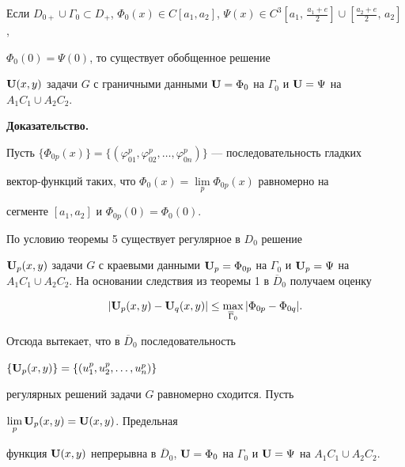 \begin{lem}


Если $D_{0+}\cup \Gamma_0\subset


D_+$, $\Phi_0(x)\in C[a_1,a_2]$, $\Psi (x)\in


C^3[a_1,\,\frac{a_1+e}{2}]\cup [\frac{a_2+e}{2},\,a_2]$,


$\Phi_0(0)=\Psi(0)$, то существует обобщенное решение


${\bold U}(x,y)$ задачи $G$ с граничными данными ${\bold


U}=\Phi_0$ на $\Gamma_0$ и ${\bold U}=\Psi$ на $A_1C_1\cup A_2C_2$.


\end{lem}





{\bf Доказательство.}


Пусть $\{\Phi_{0p}(x)\}=\{(\varphi_{01}^p,\varphi


_{02}^p,\dotsc,\varphi_{0n}^p)\}$ --- последовательность гладких


вектор-функций таких, что $\Phi


_{0}(x)=\lim\limits_p\Phi_{0p}(x)$ равномерно на


сегменте $[a_1,a_2]$ и $\Phi_{0p}(0)=\Phi_0(0)$.


По условию теоремы 5 существует регулярное в $D_0$ решение


${\bold U}_p(x,y)$ задачи $G$ с краевыми данными ${\bold U}_p=\Phi


_{0p}$ на $\Gamma_0$ и ${\bold U}_p=\Psi$ на $A_1C_1 \cup


A_2C_2$. На основании следствия из теоремы 1 в $\overline


D_0$ получаем оценку


$$


|{\bold U}_p(x,y)-{\bold U}_q(x,y)|\le \max_{\overline


\Gamma_0}|\Phi_{0p}-\Phi_{0q}|.


$$


Отсюда вытекает, что в $\overline D_0$ последовательность


$\{{\bold U}_p(x,y)\}=\{(u_1^p,u_2^p,\dotsc,u_n^p)\}$


регулярных решений задачи $G$ равномерно сходится. Пусть


$\lim\limits_p{\bold U}_p(x,y)={\bold U}(x,y)$. Предельная


функция ${\bold U}(x,y)$ непрерывна в $\overline D_0$, ${\bold


U}=\Phi_0$ на $\Gamma_0$ и ${\bold U}=\Psi$ на $A_1C_1\cup A_2C_2$.





